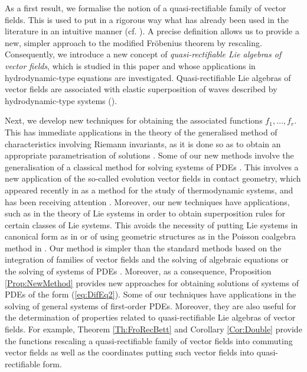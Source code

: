 \documentclass[12pt]{article}
\theoremstyle{plain}
\theoremstyle{definition}
\numberwithin{equation}{section}
\begin{document}
As a first result, we formalise the notion of a quasi-rectifiable family of vector fields. This is used to put in a rigorous way what has already been used in the literature in an intuitive manner (cf. \cite[pg. 349]{Pe74}). A precise definition allows us to provide a new, simpler approach to the modified Fr\"obenius theorem by rescaling. Consequently, we introduce a new concept of {\it quasi-rectifiable Lie algebras of vector fields}, which is studied in this paper and whose applications in hydrodynamic-type equations are investigated. Quasi-rectifiable Lie algebras of vector fields are associated with elastic superposition of waves described by hydrodynamic-type systems (\cite{Pe85}).

Next, we develop new techniques for obtaining the associated functions $f_1,\ldots,f_r$. This has immediate applications in the theory of the generalised method of characteristics involving Riemann invariants, as it is done so as to obtain an appropriate parametrisation of solutions \cite{Gr23,GL23,GV91}. Some of our new methods involve the generalisation of a classical method for solving systems of PDEs  \cite{Sn06}. This involves a new application of the so-called evolution vector fields in contact geometry, which appeared recently in \cite{SLLM20} as a method for the study of thermodynamic systems, and has been receiving attention \cite{ELLM21,LLM21}. Moreover, our new techniques have applications,  such as in the theory of Lie systems in order to obtain superposition rules for certain classes of Lie systems. This avoids the necessity of putting Lie systems in canonical form as in \cite{Wi83} or of using geometric structures as in the Poisson coalgebra method in \cite{LS20}. Our method is  simpler than the standard methods based on the integration of families of vector fields and the solving of algebraic equations \cite{Wi83} or the solving of systems of PDEs \cite{CGM07}. Moreover, as a consequence, Proposition \ref{Prop:NewMethod} provides new approaches for obtaining solutions of systems of PDEs of the form (\ref{eq:DifEq2}).  Some of our techniques have applications in the solving of general systems of first-order PDEs. Moreover, they are also useful for the determination of properties related to quasi-rectifiable Lie algebras of vector fields. For example, Theorem \ref{Th:FroRecBett} and Corollary \ref{Cor:Double} provide the functions rescaling a quasi-rectifiable family of vector fields into commuting vector fields as well as the coordinates putting such vector fields into quasi-rectifiable form.
\end{document}
